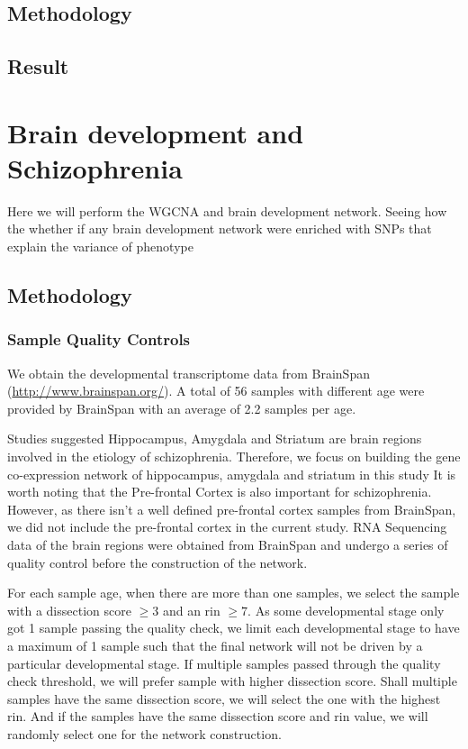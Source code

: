 \documentclass[12pt]{book}
\begin{document}
	
	\subsection{Methodology}
	\subsection{Result}
	\section{Brain development and Schizophrenia}
	Here we will perform the WGCNA and brain development network.
	Seeing how the whether if any brain development network were enriched with SNPs that explain the variance of phenotype
	\subsection{Methodology}
	\subsubsection{Sample Quality Controls}
	We obtain the developmental transcriptome data from BrainSpan (\url{http://www.brainspan.org/}). 
	A total of 56 samples with different age were provided by BrainSpan with an average of 2.2 samples per age.
	
	Studies suggested Hippocampus\citep{Velakoulis2006,Nugent2007}, Amygdala and Striatum\citep{Simpson2010} are brain regions involved in the etiology of schizophrenia. 
	Therefore, we focus on building the gene co-expression network of hippocampus, amygdala and striatum in this study
	It is worth noting that the Pre-frontal Cortex is also important for schizophrenia. 
	However, as there isn't a well defined pre-frontal cortex samples from BrainSpan, we did not include the pre-frontal cortex in the current study.
	RNA Sequencing data of the brain regions were obtained from BrainSpan and undergo a series of quality control before the construction of the network. 
	 
	For each sample age, when there are more than one samples, we select the sample with a dissection score $\ge3$ and an \gls{rin} $\ge7$. 
	As some developmental stage only got 1 sample passing the quality check, we limit each developmental stage to have a maximum of 1 sample such that the final network will not be driven by a particular developmental stage. 
	If multiple samples passed through the quality check threshold, we will prefer sample with higher dissection score. 
	Shall multiple samples have the same dissection score, we will select the one with the highest \gls{rin}. 
	And if the samples have the same dissection score and \gls{rin} value, we will randomly select one for the network construction.
	
\end{document}
